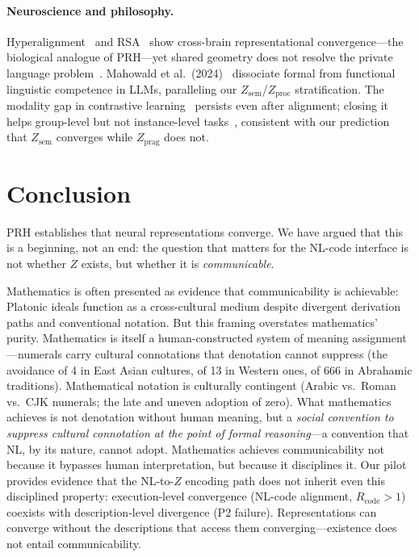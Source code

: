 \documentclass[11pt]{article}
\theoremstyle{definition}
\newcommand{\Zsem}{Z_{\text{sem}}}
\newcommand{\Zproc}{Z_{\text{proc}}}
\newcommand{\Zprag}{Z_{\text{prag}}}
\begin{document}
\paragraph{Neuroscience and philosophy.}
Hyperalignment~\cite{haxby2011hyperalignment} and RSA~\cite{kriegeskorte2008rsa} show cross-brain representational convergence---the biological analogue of PRH---yet shared geometry does not resolve the private language problem~\cite{wittgenstein1953}. Mahowald et al.\ (2024)~\cite{mahowald2024dissociating} dissociate formal from functional linguistic competence in LLMs, paralleling our $\Zsem$/$\Zproc$ stratification. The modality gap in contrastive learning~\cite{liang2022modalitygap} persists even after alignment; closing it helps group-level but not instance-level tasks~\cite{grassucci2026modgap}, consistent with our prediction that $\Zsem$ converges while $\Zprag$ does not.


\section{Conclusion}

PRH establishes that neural representations converge. We have argued that this is a beginning, not an end: the question that matters for the NL-code interface is not whether $Z$ exists, but whether it is \emph{communicable}.

Mathematics is often presented as evidence that communicability is achievable: Platonic ideals function as a cross-cultural medium despite divergent derivation paths and conventional notation. But this framing overstates mathematics' purity. Mathematics is itself a human-constructed system of meaning assignment---numerals carry cultural connotations that denotation cannot suppress (the avoidance of 4 in East Asian cultures, of 13 in Western ones, of 666 in Abrahamic traditions). Mathematical notation is culturally contingent (Arabic vs.\ Roman vs.\ CJK numerals; the late and uneven adoption of zero). What mathematics achieves is not denotation without human meaning, but a \emph{social convention to suppress cultural connotation at the point of formal reasoning}---a convention that NL, by its nature, cannot adopt. Mathematics achieves communicability not because it bypasses human interpretation, but because it disciplines it. Our pilot provides evidence that the NL-to-$Z$ encoding path does not inherit even this disciplined property: execution-level convergence (NL-code alignment, $R_{\text{code}} > 1$) coexists with description-level divergence (P2 failure). Representations can converge without the descriptions that access them converging---existence does not entail communicability.
\end{document}
